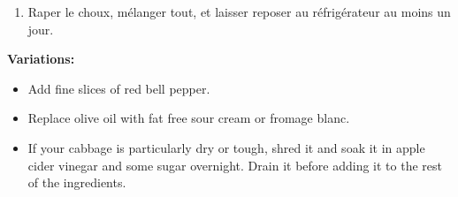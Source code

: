 
\begin{ingredients}
\end{ingredients}


\begin{recipe}
  \begin{enumerate}

  \item Raper le choux, mélanger tout, et laisser reposer au réfrigérateur au moins un jour.

  \end{enumerate}
\end{recipe}

\textbf{Variations:}

\begin{itemize}
\item Add fine slices of red bell pepper.
\item Replace olive oil with fat free sour cream or fromage blanc.
\item If your cabbage is particularly dry or tough, shred it and soak
  it in apple cider vinegar and some sugar overnight. Drain it before
  adding it to the rest of the ingredients.
\end{itemize}


